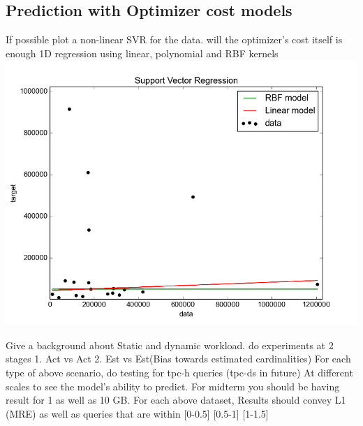 \documentclass{article}
\begin{document}
\begin{multicols}{2}
\begin{itemize}
	\end{itemize}		
	
	\subsection{Prediction with Optimizer cost models}	
	
	If possible plot a non-linear SVR for the data. will the optimizer's cost 
	itself is enough 1D regression using linear, polynomial and RBF kernels
	\includegraphics[scale=.33]{optcost.png}  
	
	
	Give a background about Static and dynamic workload.  
	do experiments at 2 stages
	1. Act vs Act
	2. Est vs Est(Bias towards estimated cardinalities)
	For each type of above scenario, do testing for tpc-h queries 
	(tpc-ds in future)
	At different scales to see the model's ability to predict.
	For midterm you should be having result for 1 as well as 10 GB.
	For each above dataset, 
	Results should convey L1 (MRE) as well as queries that are within 
	[0-0.5] [0.5-1] [1-1.5] 
	


\end{multicols}
\end{document}
